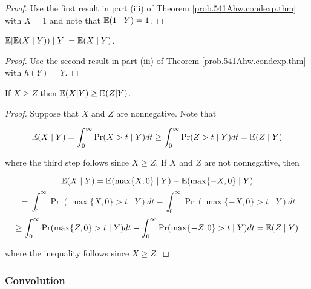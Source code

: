 \begin{proof}Use the first result in part (iii) of Theorem \ref{prob.541Ahw.condexp.thm} with \(X = 1\) and note that \(\E(1 \mid Y) = 1\).

\end{proof}

\begin{corollary}\label{prob.cor.cond.exp.cond.exp}

\end{corollary} \( \E[ \E (X \mid Y)) \mid Y]  = \E(X \mid Y)\).

\begin{proof}Use the second result in part (iii) of Theorem \ref{prob.541Ahw.condexp.thm} with \(h(Y) = Y\).

\end{proof}

\begin{lemma}\label{prob.cond.expec.pres.ineq} If $X\geq Z$ then $\E(X|Y)\geq \E(Z|Y)$. 
\end{lemma}

\begin{proof}Suppose that \(X\) and \(Z\) are nonnegative. Note that

\[
\E( X \mid Y) = \int_0^\infty \Pr(X > t \mid Y ) dt \geq  \int_0^\infty \Pr(Z > t \mid Y ) dt = \E(Z \mid Y)
\]

where the third step follows since \(X \geq Z\). If \(X\) and \(Z\) are not nonnegative, then 

\[
\E(X \mid Y) = \E(\max \{X, 0 \} \mid Y) - \E(\max \{-X, 0 \} \mid Y) 
\]
\[
= \int_0^\infty \Pr(\max \{X, 0 \} > t \mid Y ) dt -  \int_0^\infty \Pr(\max \{-X, 0 \} > t \mid Y ) dt 
\]
\[
\geq  \int_0^\infty \Pr(\max \{Z, 0 \} > t \mid Y ) dt -  \int_0^\infty \Pr(\max \{-Z, 0 \} > t \mid Y ) dt = \E(Z \mid Y)
\]

where the inequality follows since \(X \geq Z\).

\end{proof}



\subsubsection{Convolution}

